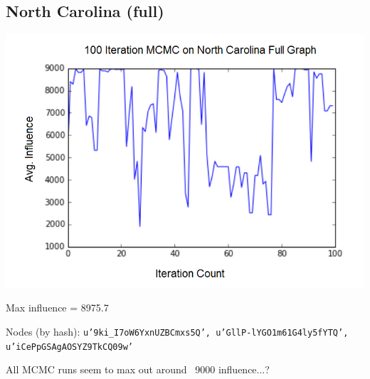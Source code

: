 \documentclass{article}
\begin{document}
	\subsection{North Carolina (full)}
		\includegraphics[scale=0.7]{nc_full_mcmc.png}
		
		Max influence = 8975.7
		
		Nodes (by hash): \texttt{u'9ki\_\-I7oW6YxnUZBCmxs5Q', u'GllP-lYGO1m61G4ly5fYTQ', u'iCePpGSAgAOSYZ9TkCQ09w'}
		
		All MCMC runs seem to max out around ~9000 influence...?
	
	
\end{document}
